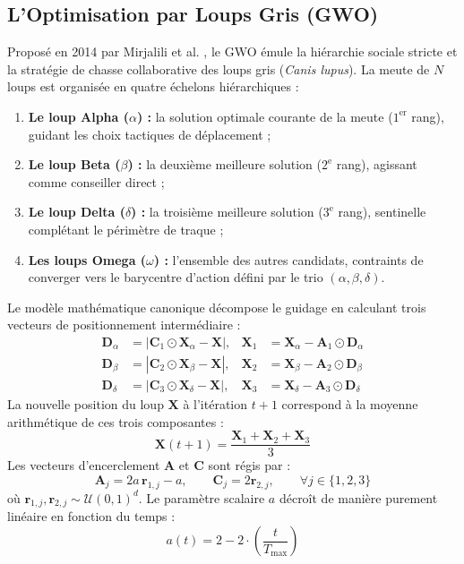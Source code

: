 \subsection{L'Optimisation par Loups Gris (GWO)}
Proposé en 2014 par Mirjalili et al. \cite{mirjalili2014grey}, le GWO émule la hiérarchie sociale stricte et la stratégie de chasse collaborative des loups gris (\textit{Canis lupus}). La meute de $N$ loups est organisée en quatre échelons hiérarchiques :
\begin{enumerate}[label=\textbf{\arabic*.}]
    \item \textbf{Le loup Alpha ($\alpha$) :} la solution optimale courante de la meute ($1^{\text{er}}$ rang), guidant les choix tactiques de déplacement ;
    \item \textbf{Le loup Beta ($\beta$) :} la deuxième meilleure solution ($2^{\text{e}}$ rang), agissant comme conseiller direct ;
    \item \textbf{Le loup Delta ($\delta$) :} la troisième meilleure solution ($3^{\text{e}}$ rang), sentinelle complétant le périmètre de traque ;
    \item \textbf{Les loups Omega ($\omega$) :} l'ensemble des autres candidats, contraints de converger vers le barycentre d'action défini par le trio $(\alpha, \beta, \delta)$.
\end{enumerate}

Le modèle mathématique canonique décompose le guidage en calculant trois vecteurs de positionnement intermédiaire :
\begin{align}
    \mathbf{D}_{\alpha} &= \left|\mathbf{C}_{1} \odot \mathbf{X}_{\alpha} - \mathbf{X}\right|, & \mathbf{X}_{1} &= \mathbf{X}_{\alpha} - \mathbf{A}_{1} \odot \mathbf{D}_{\alpha} \\
    \mathbf{D}_{\beta}  &= \left|\mathbf{C}_{2} \odot \mathbf{X}_{\beta} - \mathbf{X}\right|,  & \mathbf{X}_{2} &= \mathbf{X}_{\beta} - \mathbf{A}_{2} \odot \mathbf{D}_{\beta} \\
    \mathbf{D}_{\delta} &= \left|\mathbf{C}_{3} \odot \mathbf{X}_{\delta} - \mathbf{X}\right|, & \mathbf{X}_{3} &= \mathbf{X}_{\delta} - \mathbf{A}_{3} \odot \mathbf{D}_{\delta}
\end{align}
La nouvelle position du loup $\mathbf{X}$ à l'itération $t+1$ correspond à la moyenne arithmétique de ces trois composantes :
\begin{equation}
    \mathbf{X}(t+1) = \frac{\mathbf{X}_{1} + \mathbf{X}_{2} + \mathbf{X}_{3}}{3}
    \label{eq:gwo_avg}
\end{equation}
Les vecteurs d'encerclement $\mathbf{A}$ et $\mathbf{C}$ sont régis par :
\begin{equation}
    \mathbf{A}_j = 2a \, \mathbf{r}_{1,j} - a, \qquad \mathbf{C}_j = 2\mathbf{r}_{2,j}, \qquad \forall j \in \{1, 2, 3\}
\end{equation}
où $\mathbf{r}_{1,j}, \mathbf{r}_{2,j} \sim \mathcal{U}(0, 1)^d$. Le paramètre scalaire $a$ décroît de manière purement linéaire en fonction du temps :
\begin{equation}
    a(t) = 2 - 2 \cdot \left(\frac{t}{T_{\max}}\right)
    \label{eq:gwo_linear_a}
\end{equation}


